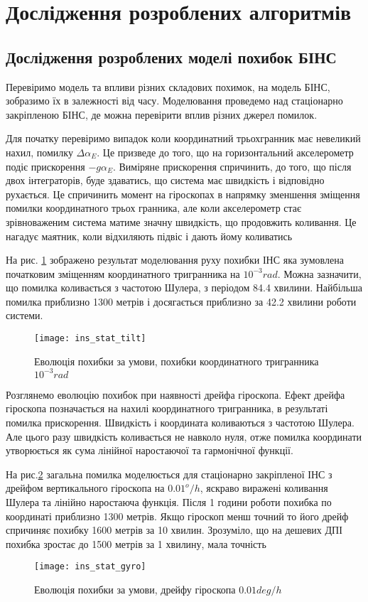 \section{Дослідження розроблених алгоритмів}

\subsection{Дослідження розроблених моделі похибок БІНС}

Перевіримо модель та впливи різних складових похимок, на модель БІНС, зобразимо їх в
залежності від часу. Моделювання проведемо над стаціонарно закріпленою БІНС, де
можна перевірити вплив різних джерел помилок.

Для початку перевіримо випадок коли координатний трьохгранник має невеликий нахил,
помилку $\Delta \alpha_{E}$. Це призведе до того, що на горизонтальний акселерометр
подіє прискорення $-g \alpha_{E}$. Виміряне прискорення спричинить, до того, що після
двох інтеграторів, буде здаватись, що система має швидкість і відповідно рухається.
Це спричинить момент на гіроскопах в напрямку зменшення зміщення помилки
координатного трьох гранника, але коли акселерометр стає зрівноваженим система 
матиме значну швидкість, що продовжить коливання. Це нагадує маятник, коли відхиляють
підвіс і дають йому коливатись

На рис. \ref{fig:ins_stat_tilt} зображено результат моделювання руху похибки ІНС
яка зумовлена початковим зміщенням координатного тригранника на $10^{-3} rad$.
Можна зазначити, що помилка коливається з частотою Шулера, з періодом 84.4 хвилини.
Найбільша помилка приблизно 1300 метрів і досягається приблизно за 42.2 хвилини
роботи системи.
\begin{figure}[here]
\centering
\texttt{[image: ins\_stat\_tilt]}
\caption{Еволюція похибки за умови, похибки координатного тригранника $10^{-3} rad$}
\label{fig:ins_stat_tilt}
\end{figure}
Розглянемо еволюцію похибок при наявності дрейфа гіроскопа. Ефект дрейфа гіроскопа
позначається на нахилі координатного тригранника, в результаті помилка прискорення.
Швидкість і координата коливаються з частотою Шулера. Але цього разу швидкість
коливається не навколо нуля, отже помилка координати утворюється як сума лінійної
наростаючої та гармонічної функції.

На рис.\ref{fig:ins_stat_gyro} загальна помилка моделюється для стаціонарно
закріпленої ІНС з дрейфом вертикального гіроскопа на $0.01^{o}/h$, яскраво
виражені коливання Шулера та лінійно наростаюча функція. Після 1 години роботи
похибка по координаті приблизно 1300 метрів. Якщо гіроскоп менш точний то його
дрейф спричиняє похибку 1600 метрів за 10 хвилин. Зрозуміло, що на дешевих 
ДПІ похибка зростає до 1500 метрів за 1 хвилину, мала точність 
\begin{figure}[here]
\centering
\texttt{[image: ins\_stat\_gyro]}
\caption{Еволюція похибки за умови, дрейфу гіроскопа $0.01 deg/h$}
\label{fig:ins_stat_gyro}
\end{figure}
